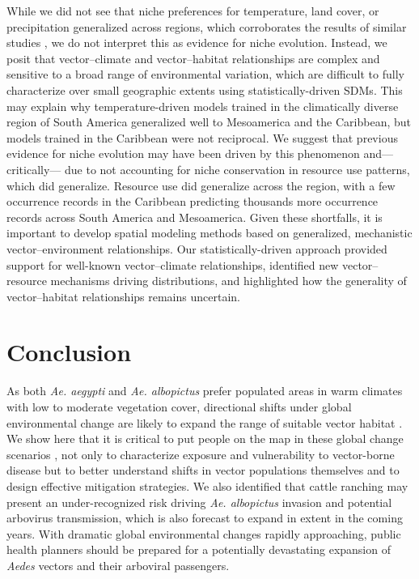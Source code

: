 While we did not see that niche preferences for temperature, land cover, or precipitation generalized across regions, which corroborates the results of similar studies \cite{Medley2010-fa, Pech-May2016-vs, Carlson2016-rc}, we do not interpret this as evidence for niche evolution. Instead, we posit that vector–climate and vector–habitat relationships are complex and sensitive to a broad range of environmental variation, which are difficult to fully characterize over small geographic extents using statistically-driven SDMs. This may explain why temperature-driven models trained in the climatically diverse region of South America generalized well to Mesoamerica and the Caribbean, but models trained in the Caribbean were not reciprocal. We suggest that previous evidence for niche evolution may have been driven by this phenomenon and—critically— due to not accounting for niche conservation in resource use patterns, which did generalize. Resource use did generalize across the region, with a few occurrence records in the Caribbean predicting thousands more occurrence records across South America and Mesoamerica. Given these shortfalls, it is important to develop spatial modeling methods based on generalized, mechanistic vector–environment relationships. Our statistically-driven approach provided support for well-known vector–climate relationships, identified new vector–resource mechanisms driving distributions, and highlighted how the generality of vector–habitat relationships remains uncertain.

\section{Conclusion}

As both \textit{Ae. aegypti} and \textit{Ae. albopictus} prefer populated areas in warm climates with low to moderate vegetation cover, directional shifts under global environmental change are likely to expand the range of suitable vector habitat \cite{Ryan2019-pz}. We show here that it is critical to put people on the map in these global change scenarios \cite{Ellis2008-xj}, not only to characterize exposure and vulnerability to vector-borne disease but to better understand shifts in vector populations themselves and to design effective mitigation strategies. We also identified that cattle ranching may present an under-recognized risk driving \textit{Ae. albopictus} invasion and potential arbovirus transmission, which is also forecast to expand in extent in the coming years. With dramatic global environmental changes rapidly approaching, public health planners should be prepared for a potentially devastating expansion of \textit{Aedes} vectors and their arboviral passengers.

\clearpage